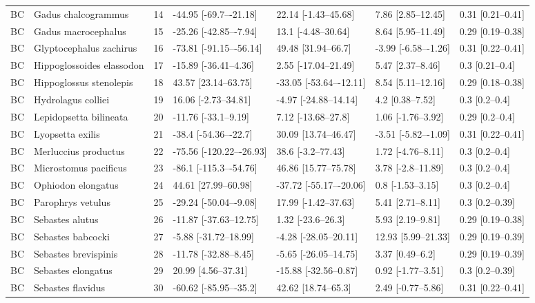\begin{longtable}[t]{lllllll}
BC & Gadus chalcogrammus & 14 & -44.95 [-69.7–-21.18] & 22.14 [-1.43–45.68] & 7.86 [2.85–12.45] & 0.31 [0.21–0.41]\\
BC & Gadus macrocephalus & 15 & -25.26 [-42.85–-7.94] & 13.1 [-4.48–30.64] & 8.64 [5.95–11.49] & 0.29 [0.19–0.38]\\
\addlinespace
BC & Glyptocephalus zachirus & 16 & -73.81 [-91.15–-56.14] & 49.48 [31.94–66.7] & -3.99 [-6.58–-1.26] & 0.31 [0.22–0.41]\\
BC & Hippoglossoides elassodon & 17 & -15.89 [-36.41–4.36] & 2.55 [-17.04–21.49] & 5.47 [2.37–8.46] & 0.3 [0.21–0.4]\\
BC & Hippoglossus stenolepis & 18 & 43.57 [23.14–63.75] & -33.05 [-53.64–-12.11] & 8.54 [5.11–12.16] & 0.29 [0.18–0.38]\\
BC & Hydrolagus colliei & 19 & 16.06 [-2.73–34.81] & -4.97 [-24.88–14.14] & 4.2 [0.38–7.52] & 0.3 [0.2–0.4]\\
BC & Lepidopsetta bilineata & 20 & -11.76 [-33.1–9.19] & 7.12 [-13.68–27.8] & 1.06 [-1.76–3.92] & 0.29 [0.2–0.4]\\
\addlinespace
BC & Lyopsetta exilis & 21 & -38.4 [-54.36–-22.7] & 30.09 [13.74–46.47] & -3.51 [-5.82–-1.09] & 0.31 [0.22–0.41]\\
BC & Merluccius productus & 22 & -75.56 [-120.22–-26.93] & 38.6 [-3.2–77.43] & 1.72 [-4.76–8.11] & 0.3 [0.2–0.4]\\
BC & Microstomus pacificus & 23 & -86.1 [-115.3–-54.76] & 46.86 [15.77–75.78] & 3.78 [-2.8–11.89] & 0.3 [0.2–0.4]\\
BC & Ophiodon elongatus & 24 & 44.61 [27.99–60.98] & -37.72 [-55.17–-20.06] & 0.8 [-1.53–3.15] & 0.3 [0.2–0.4]\\
BC & Parophrys vetulus & 25 & -29.24 [-50.04–-9.08] & 17.99 [-1.42–37.63] & 5.41 [2.71–8.11] & 0.3 [0.2–0.39]\\
\addlinespace
BC & Sebastes alutus & 26 & -11.87 [-37.63–12.75] & 1.32 [-23.6–26.3] & 5.93 [2.19–9.81] & 0.29 [0.19–0.38]\\
BC & Sebastes babcocki & 27 & -5.88 [-31.72–18.99] & -4.28 [-28.05–20.11] & 12.93 [5.99–21.33] & 0.29 [0.19–0.39]\\
BC & Sebastes brevispinis & 28 & -11.78 [-32.88–8.45] & -5.65 [-26.05–14.75] & 3.37 [0.49–6.2] & 0.29 [0.19–0.39]\\
BC & Sebastes elongatus & 29 & 20.99 [4.56–37.31] & -15.88 [-32.56–0.87] & 0.92 [-1.77–3.51] & 0.3 [0.2–0.39]\\
BC & Sebastes flavidus & 30 & -60.62 [-85.95–-35.2] & 42.62 [18.74–65.3] & 2.49 [-0.77–5.86] & 0.31 [0.22–0.41]\\

\end{longtable}
